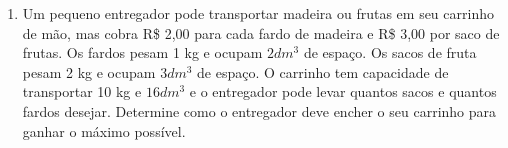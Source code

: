 \documentclass[
	12pt,				%
	openright,			%
	twoside,			%
	a4paper,			%
	english,			%
	french,				%
	brazil,				%
	sumario=tradicional
]{abntex2}
\numberwithin{example}{chapter}
\numberwithin{remark}{chapter}
\numberwithin{definition}{chapter}
\numberwithin{figure}{chapter}
\begin{document}
\begin{enumerate}
	\item Um pequeno entregador pode transportar madeira ou frutas em seu carrinho de mão, mas cobra R\$ 2,00 para cada fardo de madeira e R\$ 3,00 por saco de frutas. Os fardos pesam 1 kg e ocupam $2 dm^3$ de espaço. Os sacos de fruta pesam 2 kg e ocupam $3 dm^3$ de espaço. O carrinho tem capacidade de transportar 10 kg e $16 dm^3$ e o entregador pode levar quantos sacos e quantos fardos desejar. Determine como o entregador deve encher o seu carrinho para ganhar o máximo possível.
\end{enumerate}


%	
%	
%	
\end{document}
